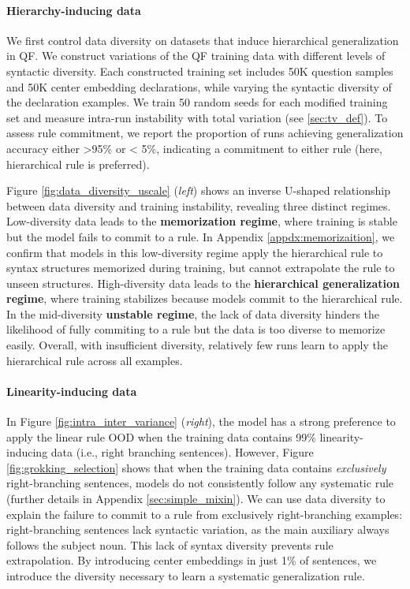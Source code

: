 \paragraph{Hierarchy-inducing data}  
We first control data diversity on datasets that induce hierarchical generalization in QF. We construct variations of the QF training data with different levels of syntactic diversity. Each constructed training set includes 50K question samples and 50K center embedding declarations, while varying the syntactic diversity of the declaration examples. We train 50 random seeds for each modified training set and measure intra-run instability with total variation (see \ref{sec:tv_def}). To assess rule commitment, we report the proportion of runs achieving generalization accuracy either >95\% or < 5\%, indicating a commitment to either rule (here, hierarchical rule is preferred).


Figure \ref{fig:data_diversity_uscale} (\textit{left}) shows an inverse U-shaped relationship between data diversity and training instability, revealing three distinct regimes. Low-diversity data leads to the \textbf{memorization regime}, where training is stable but the model fails to commit to a rule. In Appendix \ref{appdx:memorizaition}, we confirm that models in this low-diversity regime apply the hierarchical rule to syntax structures memorized during training, but cannot extrapolate the rule to unseen  structures. High-diversity data leads to the \textbf{hierarchical generalization regime}, where training stabilizes because models commit to the hierarchical rule. In the mid-diversity \textbf{unstable regime}, the lack of data diversity hinders the likelihood of fully commiting to a rule but the data is too diverse to memorize easily. Overall, with insufficient diversity, relatively few runs learn to apply the hierarchical rule across all examples.

\paragraph{Linearity-inducing data} 
In Figure \ref{fig:intra_inter_variance} (\textit{right}), the model has a strong preference to apply the linear rule OOD when the training data contains 99\% linearity-inducing data (i.e., right branching sentences). However, Figure \ref{fig:grokking_selection} shows that when the training data contains \textit{exclusively} right-branching sentences, models do not consistently follow any systematic rule (further details in  Appendix \ref{sec:simple_mixin}). We can use data diversity to explain the failure to commit to a rule from exclusively right-branching examples: right-branching sentences lack syntactic variation, as the main auxiliary always follows the subject noun. This lack of syntax diversity prevents rule extrapolation. By introducing center embeddings in just 1\% of sentences, we introduce the diversity necessary to learn a systematic generalization rule. 

